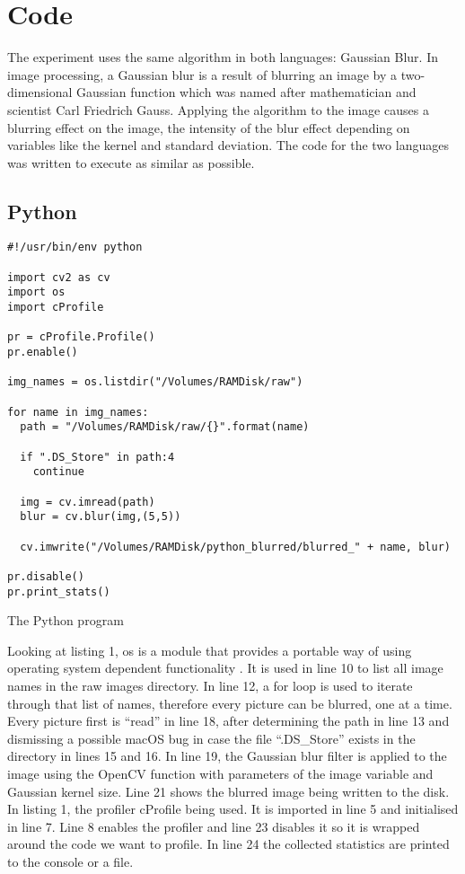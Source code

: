 \section{Code}
The experiment uses the same algorithm in both languages: Gaussian Blur. In image processing, a Gaussian blur is a result of blurring an image by a two-dimensional Gaussian function which was named after mathematician and scientist Carl Friedrich Gauss. Applying the algorithm to the image causes a blurring effect on the image, the intensity of the blur effect depending on variables like the kernel and standard deviation. The code for the two languages was written to execute as similar as possible.

\subsection{Python}

\begin{listing}[!ht]
\begin{verbatim}
#!/usr/bin/env python

import cv2 as cv
import os
import cProfile

pr = cProfile.Profile()
pr.enable()

img_names = os.listdir("/Volumes/RAMDisk/raw")

for name in img_names:
  path = "/Volumes/RAMDisk/raw/{}".format(name)

  if ".DS_Store" in path:4
    continue

  img = cv.imread(path)
  blur = cv.blur(img,(5,5))

  cv.imwrite("/Volumes/RAMDisk/python_blurred/blurred_" + name, blur)

pr.disable()
pr.print_stats()
\end{verbatim}
\caption{The Python program}
\label{listing:python}
\end{listing}

Looking at listing 1, os is a module that provides a portable way of using operating system dependent functionality \cite{os}. It is used in line 10 to list all image names in the raw images directory. In line 12, a for loop is used to iterate through that list of names, therefore every picture can be blurred, one at a time. Every picture first is “read” in line 18, after determining the path in line 13 and dismissing a possible macOS bug in case the file “.DS\_Store” exists in the directory in lines 15 and 16. In line 19, the Gaussian blur filter is applied to the image using the OpenCV function with parameters of the image variable and Gaussian kernel size. Line 21 shows the blurred image being written to the disk.
In listing 1, the profiler cProfile being used. It is imported in line 5 and initialised in line 7. Line 8 enables the profiler and line 23 disables it so it is wrapped around the code we want to profile. In line 24 the collected statistics are printed to the console or a file.

